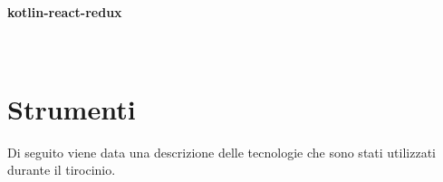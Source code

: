 \paragraph{kotlin-react-redux} \mbox{} \\


\section{Strumenti}
\label{sec:strumenti}

Di seguito viene data una descrizione delle tecnologie che sono stati utilizzati durante il tirocinio.









